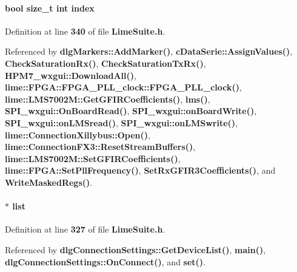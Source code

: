 \paragraph[{index}]{\setlength{\rightskip}{0pt plus 5cm}bool size\+\_\+t {\bf int} index}\label{group__FN__HIGH__LVL_ga69eaff271a229e3b1f15d41b48dc0c08}


Definition at line {\bf 340} of file {\bf Lime\+Suite.\+h}.



Referenced by {\bf dlg\+Markers\+::\+Add\+Marker()}, {\bf c\+Data\+Serie\+::\+Assign\+Values()}, {\bf Check\+Saturation\+Rx()}, {\bf Check\+Saturation\+Tx\+Rx()}, {\bf H\+P\+M7\+\_\+wxgui\+::\+Download\+All()}, {\bf lime\+::\+F\+P\+G\+A\+::\+F\+P\+G\+A\+\_\+\+P\+L\+L\+\_\+clock\+::\+F\+P\+G\+A\+\_\+\+P\+L\+L\+\_\+clock()}, {\bf lime\+::\+L\+M\+S7002\+M\+::\+Get\+G\+F\+I\+R\+Coefficients()}, {\bf lms()}, {\bf S\+P\+I\+\_\+wxgui\+::\+On\+Board\+Read()}, {\bf S\+P\+I\+\_\+wxgui\+::on\+Board\+Write()}, {\bf S\+P\+I\+\_\+wxgui\+::on\+L\+M\+Sread()}, {\bf S\+P\+I\+\_\+wxgui\+::on\+L\+M\+Swrite()}, {\bf lime\+::\+Connection\+Xillybus\+::\+Open()}, {\bf lime\+::\+Connection\+F\+X3\+::\+Reset\+Stream\+Buffers()}, {\bf lime\+::\+L\+M\+S7002\+M\+::\+Set\+G\+F\+I\+R\+Coefficients()}, {\bf lime\+::\+F\+P\+G\+A\+::\+Set\+Pll\+Frequency()}, {\bf Set\+Rx\+G\+F\+I\+R3\+Coefficients()}, and {\bf Write\+Masked\+Regs()}.

\paragraph[{list}]{ $\ast$ list}\label{group__FN__HIGH__LVL_gab1fde1d41a8c00a4279c80226c9153e3}


Definition at line {\bf 327} of file {\bf Lime\+Suite.\+h}.



Referenced by {\bf dlg\+Connection\+Settings\+::\+Get\+Device\+List()}, {\bf main()}, {\bf dlg\+Connection\+Settings\+::\+On\+Connect()}, and {\bf set()}.

